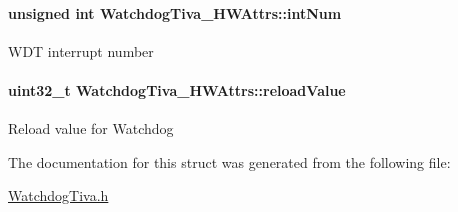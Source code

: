 \paragraph[{int\-Num}]{\setlength{\rightskip}{0pt plus 5cm}unsigned int Watchdog\-Tiva\-\_\-\-H\-W\-Attrs\-::int\-Num}\label{struct_watchdog_tiva___h_w_attrs_aebd70848c54717c57475a01618a68f50}
W\-D\-T interrupt number 
\paragraph[{reload\-Value}]{\setlength{\rightskip}{0pt plus 5cm}uint32\-\_\-t Watchdog\-Tiva\-\_\-\-H\-W\-Attrs\-::reload\-Value}\label{struct_watchdog_tiva___h_w_attrs_a89674a9a8537a33a7e5ef4b94ac8f5e4}
Reload value for Watchdog 

The documentation for this struct was generated from the following file\-:\begin{DoxyCompactItemize}
\item 
\hyperlink{_watchdog_tiva_8h}{Watchdog\-Tiva.\-h}\end{DoxyCompactItemize}
